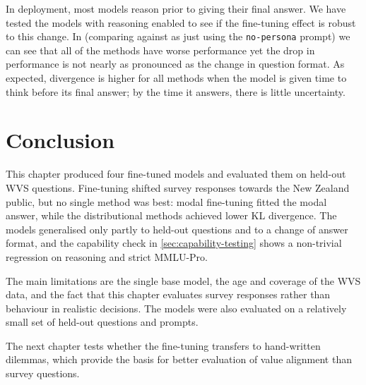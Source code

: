 
In deployment, most models reason prior to giving their final answer. We have tested the models with reasoning enabled to see if the fine-tuning effect is robust to this change. In  (comparing against  as just using the \texttt{no-persona} prompt) we can see that all of the methods have worse performance yet the drop in performance is not nearly as pronounced as the change in question format. As expected, divergence is higher for all methods when the model is given time to think before its final answer; by the time it answers, there is little uncertainty.



\section{Conclusion}

This chapter produced four fine-tuned models and evaluated them on held-out WVS questions. Fine-tuning shifted survey responses towards the New Zealand public, but no single method was best: modal fine-tuning fitted the modal answer, while the distributional methods achieved lower KL divergence. The models generalised only partly to held-out questions and to a change of answer format, and the capability check in \ref{sec:capability-testing} shows a non-trivial regression on reasoning and strict MMLU-Pro. 

The main limitations are the single base model, the age and coverage of the WVS data, and the fact that this chapter evaluates survey responses rather than behaviour in realistic decisions. The models were also evaluated on a relatively small set of held-out questions and prompts.

The next chapter tests whether the fine-tuning transfers to hand-written dilemmas, which provide the basis for better evaluation of value alignment than survey questions.
